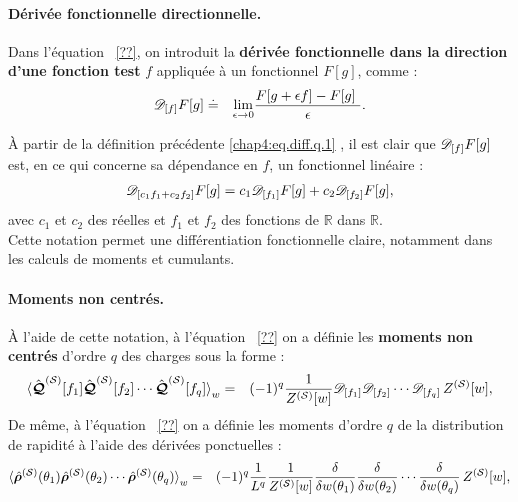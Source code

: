 \paragraph{Dérivée fonctionnelle directionnelle.}
Dans l'équation ~\eqref{??}, on introduit la {\bf dérivée fonctionnelle dans la direction d’une fonction test } $f$ appliquée à un fonctionnel $F[g]$, comme :
\begin{eqnarray}\label{chap4:eq.diff.q.1}
	\dfonc{f} F[g] & \doteq &  \underset{\epsilon \to 0 }{ \lim  } \frac{ F[g + \epsilon f ]  - F [ g] }{\epsilon} .	
\end{eqnarray}

À partir de la définition précédente \eqref{chap4:eq.diff.q.1} , il est clair que $\mathscr{D}_{[f]} F[g]$ est, en ce qui concerne sa dépendance en $f$, un fonctionnel linéaire :
\begin{eqnarray}\label{chap4:eq.diff.lin.q.1}
	\mathscr{D}_{[c_1f_1 + c_2 f_2]}F[g] = c_1 \mathscr{D}_{[f_1]}F[g] + c_2 \mathscr{D}_{[f_2]}F[g],
\end{eqnarray}
avec $c_1$ et $c_2$ des réelles et $f_1$ et $f_2$ des fonctions de $\mathbb{R}$ dans $\mathbb{R}$.\\

Cette notation permet une différentiation fonctionnelle claire, notamment dans les calculs de moments et cumulants.

\paragraph{Moments non centrés.}
À l’aide de cette notation, à l'équation ~\eqref{??} on a définie les {\bf moments non centrés} d’ordre $q$ des charges sous la forme :
\begin{eqnarray}\label{chap4:eq.moment.charge.q.1}
	\braket{\hat{\bm{\mathcal{Q}}}^{(\mathcal{S})}[f_1] \hat{\bm{\mathcal{Q}}}^{(\mathcal{S})}[f_2] \cdots \hat{\bm{\mathcal{Q}}}^{(\mathcal{S})}[f_q]}_w  & = & (-1)^q \frac{1}{Z^{(\mathcal{S})}[w]}\mathscr{D}_{[f_1]} \mathscr{D}_{[f_2]} \cdots \mathscr{D}_{[f_q]}\,  Z^{(\mathcal{S})}[w], 	
\end{eqnarray}
De même, à l'équation ~\eqref{??} on a définie les moments d’ordre $q$ de la distribution de rapidité à l’aide des dérivées  ponctuelles :
\begin{eqnarray}\label{chap4:eq.moment.distr.q.1}
	\braket{\hat{\bm{\rho}}^{(\mathcal{S})}(\theta_1) \hat{\bm{\rho}}^{(\mathcal{S})}(\theta_2) \cdots \hat{\bm{\rho}}^{(\mathcal{S})}(\theta_q)}_w  & = & (-1)^q \frac{1}{L^q}\frac{1}{Z^{(\mathcal{S})}[w]}\frac{\delta}{\delta w(\theta_1)} \frac{\delta}{\delta w(\theta_2)} \cdots \frac{\delta}{\delta w(\theta_q)}\,  Z^{(\mathcal{S})}[w], 	
\end{eqnarray}

